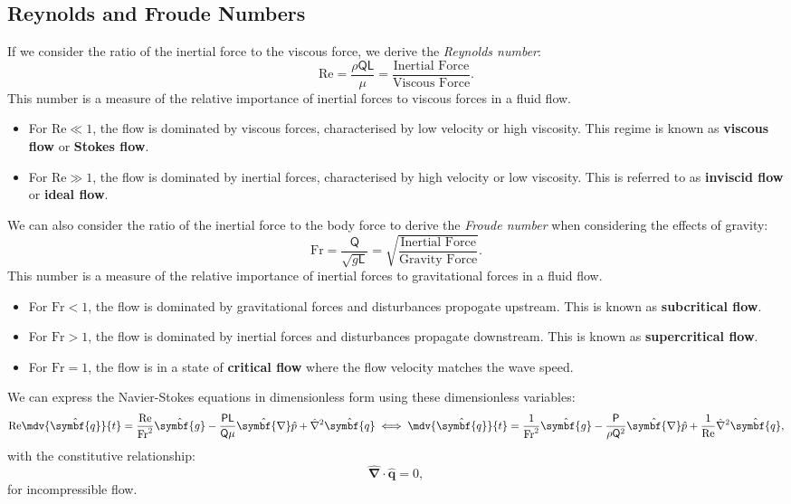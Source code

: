 \documentclass{article}
\theoremstyle{definition}
\begin{document}
\subsection{Reynolds and Froude Numbers}
If we consider the ratio of the inertial force to the viscous force, we
derive the \textit{Reynolds number}:
\begin{equation*}
    \mathrm{Re} = \frac{\rho \mathsf{Q} \mathsf{L}}{\mu} = \frac{\text{Inertial Force}}{\text{Viscous Force}}.
\end{equation*}
This number is a measure of the relative importance of inertial forces
to viscous forces in a fluid flow.
\begin{itemize}
    \item For \(\mathrm{Re} \ll 1\), the flow is dominated by viscous
          forces, characterised by low velocity or high viscosity. This
          regime is known as \textbf{viscous flow} or \textbf{Stokes
          flow}.
    \item For \(\mathrm{Re} \gg 1\), the flow is dominated by inertial
          forces, characterised by high velocity or low viscosity. This
          is referred to as \textbf{inviscid flow} or \textbf{ideal
          flow}.
\end{itemize}
We can also consider the ratio of the inertial force to the body force
to derive the \textit{Froude number} when considering the effects of
gravity:
\begin{equation*}
    \mathrm{Fr} = \frac{\mathsf{Q}}{\sqrt{g \mathsf{L}}} = \sqrt{\frac{\text{Inertial Force}}{\text{Gravity Force}}}.
\end{equation*}
This number is a measure of the relative importance of inertial forces
to gravitational forces in a fluid flow.
\begin{itemize}
    \item For \(\mathrm{Fr} < 1\), the flow is dominated by
          gravitational forces and disturbances propogate upstream.
          This is known as \textbf{subcritical flow}.
    \item For \(\mathrm{Fr} > 1\), the flow is dominated by inertial
          forces and disturbances propagate downstream. This is known
          as \textbf{supercritical flow}.
    \item For \(\mathrm{Fr} = 1\), the flow is in a state of
          \textbf{critical flow} where the flow velocity matches the
          wave speed.
\end{itemize}
We can express the Navier-Stokes equations in dimensionless form using
these dimensionless variables:
\begin{equation*}
    \mathrm{Re} \mdv{\hat{\symbf{q}}}{t} = \frac{\mathrm{Re}}{\mathrm{Fr}^2} \hat{\symbf{g}} - \frac{\mathsf{P} \mathsf{L}}{\mathsf{Q} \mu} \hat{\symbf{\nabla}} \hat{p} + \hat{\nabla}^2 \hat{\symbf{q}} \iff \mdv{\hat{\symbf{q}}}{t} = \frac{1}{\mathrm{Fr}^2} \hat{\symbf{g}} - \frac{\mathsf{P}}{\rho \mathsf{Q}^2} \hat{\symbf{\nabla}} \hat{p} + \frac{1}{\mathrm{Re}} \hat{\nabla}^2 \hat{\symbf{q}},
\end{equation*}
with the constitutive relationship:
\begin{equation*}
    \hat{\symbf{\nabla}} \cdot \hat{\symbf{q}} = 0,
\end{equation*}
for incompressible flow.
\end{document}
